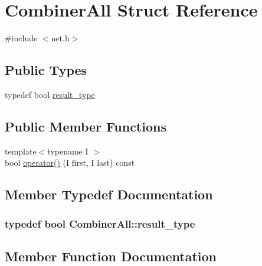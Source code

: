 \hypertarget{struct_combiner_all}{}\section{Combiner\+All Struct Reference}
\label{struct_combiner_all}


{\ttfamily \#include $<$net.\+h$>$}

\subsection*{Public Types}
\begin{DoxyCompactItemize}
\item 
typedef bool \hyperlink{struct_combiner_all_ae9075371bfb6f2b47eee3bb86eded765}{result\+\_\+type}
\end{DoxyCompactItemize}
\subsection*{Public Member Functions}
\begin{DoxyCompactItemize}
\item 
{\footnotesize template$<$typename I $>$ }\\bool \hyperlink{struct_combiner_all_a5c49747c323077068c202461efeefaf3}{operator()} (I first, I last) const 
\end{DoxyCompactItemize}


\subsection{Member Typedef Documentation}
\hypertarget{struct_combiner_all_ae9075371bfb6f2b47eee3bb86eded765}{}
\subsubsection[{result\+\_\+type}]{\setlength{\rightskip}{0pt plus 5cm}typedef bool {\bf Combiner\+All\+::result\+\_\+type}}\label{struct_combiner_all_ae9075371bfb6f2b47eee3bb86eded765}


\subsection{Member Function Documentation}
\hypertarget{struct_combiner_all_a5c49747c323077068c202461efeefaf3}{}
